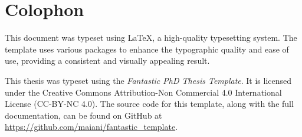 \documentclass[../main]{subfiles}
\begin{document}
\chapter*{Colophon}
\label{ch:colophon}

This document was typeset using \LaTeX{}, a high-quality typesetting system. The template uses various packages to enhance the typographic quality and ease of use, providing a consistent and visually appealing result.

This thesis was typeset using the \textit{Fantastic PhD Thesis Template}. It is licensed under the Creative Commons Attribution-Non Commercial 4.0 International License (CC-BY-NC 4.0). The source code for this template, along with the full documentation, can be found on GitHub at \url{https://github.com/maiani/fantastic_template}.
\end{document}
